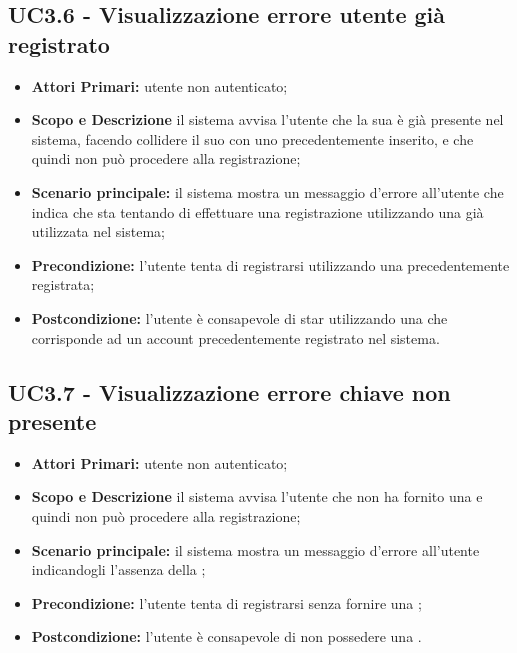 \documentclass[AnalisiDeiRequisiti.tex]{subfiles}
\begin{document}
\subsection{UC3.6 - Visualizzazione errore utente già registrato}
\begin{itemize}
	\item \textbf{Attori Primari:} utente non autenticato;
	\item \textbf{Scopo e Descrizione} il sistema avvisa l'utente che la sua  è già presente nel sistema, facendo collidere il suo  con uno precedentemente inserito, e che quindi non può procedere alla registrazione;
	\item \textbf{Scenario principale:} il sistema mostra un messaggio d'errore all'utente che indica che sta tentando di effettuare una registrazione utilizzando una  già utilizzata nel sistema;
	\item \textbf{Precondizione:} l'utente tenta di registrarsi utilizzando una  precedentemente registrata;
	\item \textbf{Postcondizione:} l'utente è consapevole di star utilizzando una  che corrisponde ad un account precedentemente registrato nel sistema.
\end{itemize}
\subsection{UC3.7 - Visualizzazione errore chiave non presente}
\begin{itemize}
	\item \textbf{Attori Primari:} utente non autenticato;
	\item \textbf{Scopo e Descrizione} il sistema avvisa l'utente che non ha fornito una  e quindi non può procedere alla registrazione;
	\item \textbf{Scenario principale:} il sistema mostra un messaggio d'errore all'utente indicandogli l'assenza della ;
	\item \textbf{Precondizione:} l'utente tenta di registrarsi senza fornire una ;
	\item \textbf{Postcondizione:} l'utente è consapevole di non possedere una .
\end{itemize}
\end{document}
